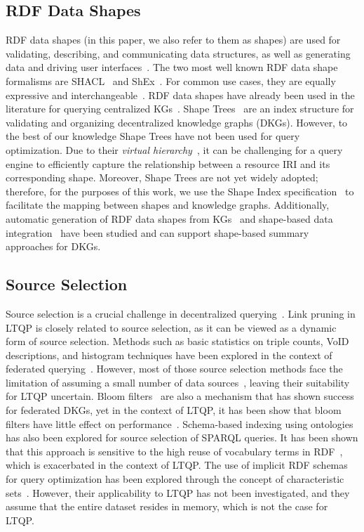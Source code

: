 \subsection{RDF Data Shapes}
RDF data shapes (in this paper, we also refer to them as shapes) are used for validating, describing, and communicating data structures, as well as generating data and driving user interfaces~\cite{Gayo2018a,Gayo2018}.
The two most well known RDF data shape formalisms are SHACL~\cite{Gayo2018b} and ShEx~\cite{Gayo2018}.
For common use cases, they are equally expressive and interchangeable~\cite{Gayo2018c}.
RDF data shapes have already been used in the literature for querying centralized KGs~\cite{kashif2021, delva2023}.
Shape Trees~\cite{shapetreesShapeTrees} are an index structure for validating and organizing decentralized knowledge graphs (DKGs).
However, to the best of our knowledge Shape Trees have not been used for query optimization. 
Due to their \emph{virtual hierarchy}~\cite{shapetreesShapeTrees}, it can be challenging for a query engine to efficiently capture the relationship between a resource IRI and its corresponding shape. 
Moreover, Shape Trees are not yet widely adopted; therefore, for the purposes of this work, we use the Shape Index specification~\cite{tam2024opportunitiesshapebasedoptimizationlink} to facilitate the mapping between shapes and knowledge graphs. 
Additionally, automatic generation of RDF data shapes from KGs~\cite{fernandez2023extracting} and shape-based data integration~\cite{LabraGayo2023} have been studied and can support shape-based summary approaches for DKGs.

\subsection{Source Selection}
Source selection is a crucial challenge in decentralized querying~\cite{hose2012towards, Harth2010}. 
Link pruning in LTQP is closely related to source selection, as it can be viewed as a dynamic form of source selection.
Methods such as basic statistics on triple counts, VoID descriptions, and histogram techniques have been explored in the context of federated querying~\cite{hose2012towards, Harth2010, Montoya2017}.
However, most of those source selection methods face the limitation of assuming a small number of data sources~\cite{Harth2010}, leaving their suitability for LTQP uncertain.
Bloom filters~\cite{dia2018fast} are also a mechanism that has shown success for federated DKGs, yet in the context of LTQP, it has been show that bloom filters have little effect on performance~\cite{Hanski2024}.
Schema-based indexing using ontologies~\cite{Stuckenschmidt2004} has also been explored for source selection of SPARQL queries.
It has been shown that this approach is sensitive to the high reuse of vocabulary terms in RDF~\cite{Harth2010}, which is exacerbated in the context of LTQP.
The use of implicit RDF schemas for query optimization has been explored through the concept of characteristic sets~\cite{Neumann2011CharacteristicSA, Meimaris2017ExtendedCS, Montoya2017}. 
However, their applicability to LTQP has not been investigated, and they assume that the entire dataset resides in memory, which is not the case for LTQP.
